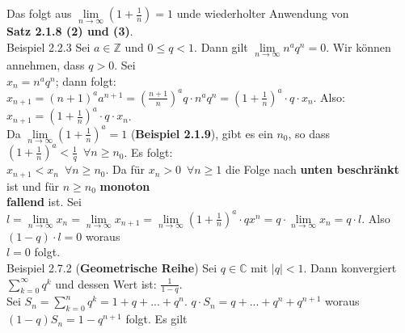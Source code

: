 \documentclass[10pt]{article}
\begin{document}
                Das folgt aus
                \textcolor{NavyBlue}{$\lim\limits_{n\to\infty}(1+\frac{1}{n})=1$}
                unde wiederholter Anwendung von\\
        \indent \textbf{Satz 2.1.8 (2) und (3)}.\\
\colorbox{Dandelion}{Beispiel 2.2.3} Sei \textcolor{NavyBlue}{$a\in\mathbb{Z}$} und 
                \textcolor{NavyBlue}{$0\leqslant q<1$}.
                Dann gilt \textcolor{NavyBlue}{$\lim\limits_{n\to\infty}n^aq^n=0$}.
                Wir können annehmen, dass \textcolor{NavyBlue}{$q>0$}. Sei \\
        \indent \textcolor{NavyBlue}{$x_n=n^aq^n$}; dann folgt:
                \textcolor{NavyBlue}{$x_{n+1}=(n+1)^aa^{n+1}=(\frac{n+1}{n})^aq\cdot n^aq^n
                =(1+\frac{1}{n})^a\cdot q\cdot x_n$}. Also:
                \textcolor{NavyBlue}{$x_{n+1}=(1+\frac{1}{n})^a\cdot q\cdot x_n$}. \\
        \indent Da \textcolor{NavyBlue}{$\lim\limits_{n\to\infty}(1+\frac{1}{n})^a=1$}
                (\textbf{Beispiel 2.1.9}), gibt es ein \textcolor{NavyBlue}{$n_0$}, so dass
                \textcolor{NavyBlue}{
                $(1+\frac{1}{n})^a<\frac{1}{q}\enspace\forall n\geqslant n_0$}.
                Es folgt: \\
        \indent \textcolor{NavyBlue}{$x_{n+1}<x_n\enspace\forall n\geqslant n_0$}. 
                Da für \textcolor{NavyBlue}{$x_n>0\enspace\forall n\geqslant1$} 
                die Folge nach \textbf{unten beschränkt} ist und für 
                \textcolor{NavyBlue}{$n\geqslant n_0$} \textbf{monoton\\
        \indent fallend} ist.
                Sei \textcolor{NavyBlue}{$l=\lim\limits_{n\to\infty}x_n
                =\lim\limits_{n\to\infty}x_{n+1}
                =\lim\limits_{n\to\infty}(1+\frac{1}{n})^a\cdot qx^n
                =q\cdot\lim\limits_{n\to\infty}x_n=q\cdot l$}.
                Also \textcolor{NavyBlue}{$(1-q)\cdot l=0$} woraus \\
        \indent \textcolor{NavyBlue}{$l=0$} folgt.\\
\colorbox{Dandelion}{Beispiel 2.7.2} (\textbf{Geometrische Reihe}) Sei $q\in\mathbb{C}$ mit 
                $|q|<1$. Dann konvergiert $\sum_{k=0}^\infty q^k$ und
                dessen Wert ist: $\frac{1}{1-q}$. \\
        \indent Sei $S_n=\sum_{k=0}^n q^k=1+q+...+q^n.$
                $q\cdot S_n=q+...+q^n+q^{n+1}$ woraus
                $(1-q)S_n=1-q^{n+1}$ folgt. Es gilt \\
\end{document}
